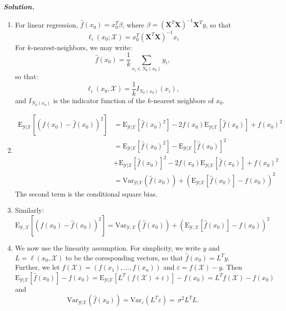 \documentclass[12pt]{article}
\def\eps{\varepsilon}
\def\eps{\varepsilon}
\def\bX{\textbf{X}}
\def\E{\text{E}}
\def\var{\text{Var}}
\newenvironment{solution}[1][\it{Solution}]{\textbf{#1. } }{\vspace{.5cm}}
\begin{document}
\begin{solution}\begin{enumerate}
    \item [(a)]  For linear regression, $\hat{f}(x_0) = x_0^T \beta$, where $\beta = (\bX^T\bX)^{-1}\bX^T y$, so that $$\ell_i(x_0; \mathcal{X}) = x_0^T(\bX^T\bX)^{-1}x_i$$
    For $k$-nearest-neighbors, we may write:
    $$\hat{f}(x_0) = \frac{1}{k}\sum_{x_i \in N_k(x_0)} y_i,$$
    so that:
    $$\ell_i(x_0, \mathcal{X}) = \frac{1}{k} I_{N_k(x_0)}(x_i),$$
    and $I_{N_k(x_0)}$ is the indicator function of the $k$-nearest neighbors of $x_0$.

    \item [(b)]
    $$\begin{aligned}\E_{\mathcal{Y}| \mathcal{X}}[(f(x_0) - \hat{f}(x_0))^2] &= \E_{\mathcal{Y}| \mathcal{X}}[\hat{f}(x_0)^2] -2 f(x_0)\E_{\mathcal{Y}| \mathcal{X}}[\hat{f}(x_0)] + f(x_0)^2 \\
    &= \E_{\mathcal{Y}| \mathcal{X}}[\hat{f}(x_0)^2]- \E_{\mathcal{Y}| \mathcal{X}}[\hat{f}(x_0)]^2\\
    &+ \E_{\mathcal{Y}| \mathcal{X}}[\hat{f}(x_0)]^2 -2 f(x_0)\E_{\mathcal{Y}| \mathcal{X}}[\hat{f}(x_0)] + f(x_0)^2 \\
    &= \var_{\mathcal{Y}|\mathcal{X}}(\hat{f}(x_0)) + (\E_{\mathcal{Y}| \mathcal{X}}[\hat{f}(x_0)]- f(x_0))^2 
    \end{aligned}$$
    The second term is the conditional square bias. 
    \item [(c)] Similarly:
    $$\E_{\mathcal{Y}, \mathcal{X}}[(f(x_0) - \hat{f}(x_0))^2]  = \var_{\mathcal{Y},\mathcal{X}}(\hat{f}(x_0)) + (\E_{\mathcal{Y}, \mathcal{X}}[\hat{f}(x_0)]- f(x_0))^2 $$

    \item [(d)] We now use the linearity assumption. For simplicity, we write $y$ and $L = \ell(x_0, \mathcal{X})$ to be the coresponding vectors, so that $\hat{f}(x_0) = L^T y$. Further, we let $f(\mathcal{X}) = (f(x_1), \dots, f(x_n))$ and $\eps = f(\mathcal{X})-y$. Then
    $$\E_{\mathcal{Y}| \mathcal{X}}[\hat{f}(x_0)]- f(x_0) =  \E_{\mathcal{Y}| \mathcal{X}}[L^T(f(\mathcal{X})+\eps)]- f(x_0) = L^Tf(\mathcal{X})-f(x_0)$$
    and
    $$\var_{\mathcal{Y}|\mathcal{X}}(\hat{f}(x_0)) = \var_{\eps}(L^T\eps) = \, \sigma^2 L^T L.$$
\end{enumerate}
\end{solution}

\newpage
\end{document}
